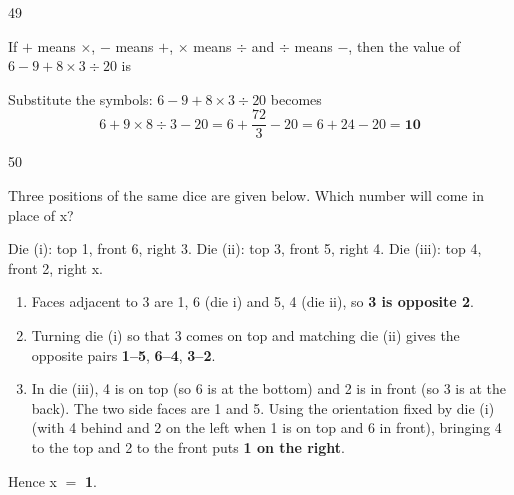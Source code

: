 \begin{question}{49}
{If $+$ means $\times$, $-$ means $+$, $\times$ means $\div$ and $\div$ means $-$, then the value of $6-9+8\times3\div20$ is\par}
\begin{explain}
Substitute the symbols: $6-9+8\times3\div20$ becomes
\[6+9\times8\div3-20=6+\frac{72}{3}-20=6+24-20=\mathbf{10}\]
\end{explain}
\end{question}

\begin{question}{50}
{Three positions of the same dice are given below. Which number will come in place of x?\par}
\begin{explain}
Die (i): top 1, front 6, right 3. Die (ii): top 3, front 5, right 4. Die (iii): top 4, front 2, right x.
\begin{enumerate}
\item Faces adjacent to 3 are 1, 6 (die i) and 5, 4 (die ii), so \textbf{3 is opposite 2}.
\item Turning die (i) so that 3 comes on top and matching die (ii) gives the opposite pairs \textbf{1--5}, \textbf{6--4}, \textbf{3--2}.
\item In die (iii), 4 is on top (so 6 is at the bottom) and 2 is in front (so 3 is at the back). The two side faces are 1 and 5. Using the orientation fixed by die (i) (with 4 behind and 2 on the left when 1 is on top and 6 in front), bringing 4 to the top and 2 to the front puts \textbf{1 on the right}.
\end{enumerate}
Hence x $=$ \textbf{1}.
\end{explain}
\end{question}
